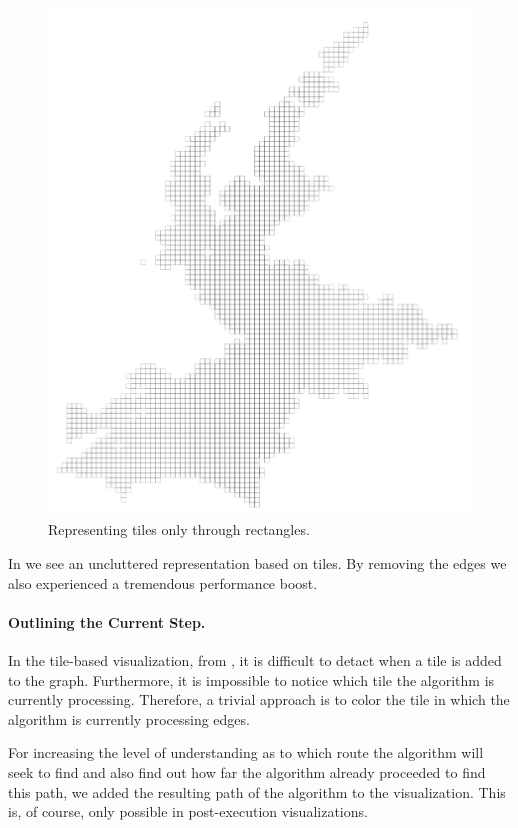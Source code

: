 \documentclass
[
    paper = a4,
    pagesize,
    12 pt,
    oneside,                       %
    open = right,
    DIV = calc,
    BCOR = 0 mm,                   %
    bibtotoc
]
{scrbook}
\begin{document}
\begin{figure}
        \includegraphics[width=\textwidth]{Images/vis-only-rectangles.png}
\caption[]{Representing tiles only through rectangles.}
\label{fig:only_rectangles}
\end{figure}

In  we see an uncluttered representation based on tiles.
By removing the edges we also experienced a tremendous performance boost.


\paragraph{Outlining the Current Step.}

In the tile-based visualization, from , it is difficult to detact when a tile is added to the graph.
Furthermore, it is impossible to notice which tile the algorithm is currently processing.
Therefore, a trivial approach is to color the tile in which the algorithm is currently processing edges.

For increasing the level of understanding as to which route the algorithm will seek to find and also find out how far the algorithm already proceeded to find this path, we added the resulting path of the algorithm to the visualization.
This is, of course, only possible in post-execution visualizations.
\end{document}
